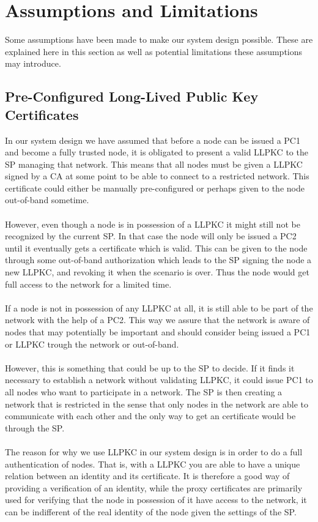 \section{Assumptions and Limitations}
Some assumptions have been made to make our system design possible. These are explained here in this section as well as potential limitations these assumptions may introduce.

\subsection{Pre-Configured Long-Lived Public Key Certificates}
In our system design we have assumed that before a node can be issued a PC1 and become a fully trusted node, it is obligated to present a valid LLPKC to the SP managing that network. This means that all nodes must be given a LLPKC signed by a CA at some point to be able to connect to a restricted network. This certificate could either be manually pre-configured or perhaps given to the node out-of-band sometime. 
\\\\
However, even though a node is in possession of a LLPKC it might still not be recognized by the current SP. In that case the node will only be issued a PC2 until it eventually gets a certificate which is valid. This can be given to the node through some out-of-band authorization which leads to the SP signing the node a new LLPKC, and revoking it when the scenario is over. Thus the node would get full access to the network for a limited time.
\\\\
If a node is not in possession of any LLPKC at all, it is still able to be part of the network with the help of a PC2. This way we assure that the network is aware of nodes that may potentially be important and should consider being issued a PC1 or LLPKC trough the network or out-of-band.
\\\\
However, this is something that could be up to the SP to decide. If it finds it necessary to establish a network without validating LLPKC, it could issue PC1 to all nodes who want to participate in a network. The SP is then creating a network that is restricted in the sense that only nodes in the network are able to communicate with each other and the only way to get an certificate would be through the SP.
\\\\
The reason for why we use LLPKC in our system design is in order to do a full authentication of nodes. That is, with a LLPKC you are able to have a unique relation between an identity and its certificate. It is therefore a good way of providing a verification of an identity, while the proxy certificates are primarily used for verifying that the node in possession of it have access to the network, it can be indifferent of the real identity of the node given the settings of the SP.

